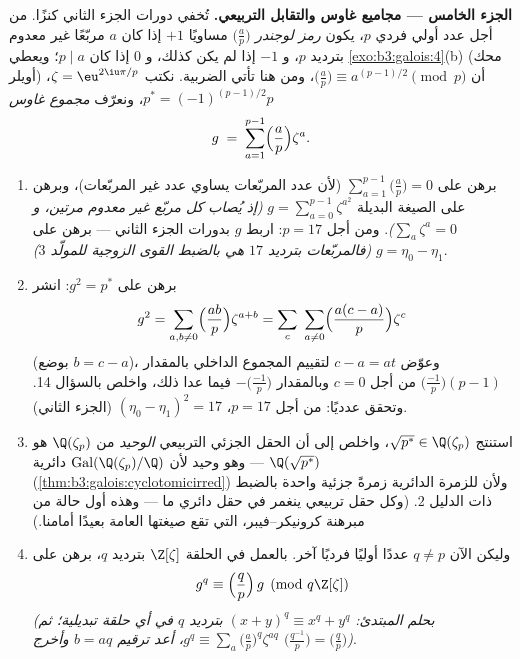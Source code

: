 \begin{problem}
\medskip
\noindent\textbf{الجزء الخامس --- مجاميع غاوس والتقابل
التربيعي.} تُخفي دورات الجزء الثاني كنزًا. من أجل عدد أولي فردي
$p$، يكون \emph{رمز لوجندر} $\bigl(\frac
ap\bigr)$ مساويًا $+1$ إذا كان $a$
مربّعًا غير معدوم بترديد $p$، و $-1$ إذا لم يكن كذلك، و $0$ إذا
كان $p \mid a$؛ ويعطي \cref{exo:b3:galois:4}(b) (محك أويلر) أن $\bigl(\frac ap\bigr) \equiv
a^{(p-1)/2} \pmod p$،
ومن هنا تأتي الضربية. نكتب $\zeta =
\eu^{2\iu\pi/p}$، $p^* = (-1)^{(p-1)/2}p$، ونعرّف \emph{مجموع
غاوس}
\[
g \;=\; \sum_{a=1}^{p-1}\Bigl(\frac ap\Bigr)\zeta^a .
\]
\begin{enumerate}[resume]
  \item برهن على $\sum_{a=1}^{p-1}\bigl(\frac ap\bigr) = 0$ (لأن عدد المربّعات يساوي عدد غير
        المربّعات)، وبرهن على الصيغة البديلة $g = \sum_{a=0}^{p-1}\zeta^{a^2}$ \emph{(إذ
        يُصاب كل مربّع غير معدوم مرتين، و $\sum_{a}\zeta^a = 0$)}. ومن أجل
        $p = 17$: اربط $g$ بدورات الجزء الثاني --- برهن على
        $g = \eta_0 - \eta_1$ \emph{(فالمربّعات بترديد $17$ هي بالضبط القوى
        الزوجية للمولّد $3$)}.
  \item برهن على $g^2 = p^*$: انشر
        \[
        g^2 = \sum_{a,b\neq0}\Bigl(\frac{ab}p\Bigr)
        \zeta^{a+b}
        = \sum_{c}\ \sum_{a \neq 0}\Bigl(\frac{a(c -
        a)}p\Bigr)\zeta^{c}
        \]
        (بوضع $b = c - a$)، وعوّض $c - a = at$ لتقييم المجموع
        الداخلي بالمقدار $\bigl(\frac{-1}p\bigr)(p - 1)$ من أجل $c = 0$ وبالمقدار
        $-\bigl(\frac{-1}p\bigr)$ فيما عدا ذلك، واخلص بالسؤال 14. وتحقق عدديًا:
        من أجل $p =
        17$، $(\eta_0 - \eta_1)^2 = 17$ (الجزء الثاني).
  \item استنتج $\sqrt{p^*} \in \Q(\zeta_p)$، واخلص إلى أن الحقل الجزئي التربيعي
        \emph{الوحيد} من $\Q(\zeta_p)$ هو $\Q(\sqrt{p^*})$ ---
        وهو وحيد لأن $\operatorname{Gal}(\Q(\zeta_p)/\Q)$ دائرية (\cref{thm:b3:galois:cyclotomicirred}) ولأن للزمرة
        الدائرية زمرةً جزئية واحدة بالضبط ذات الدليل $2$. (وكل
        حقل تربيعي ينغمر في حقل دائري ما --- وهذه أول حالة من
        مبرهنة كرونيكر--فيبر، التي تقع صيغتها العامة بعيدًا
        أمامنا.)
  \item وليكن الآن $q \neq p$ عددًا أوليًا فرديًا آخر. بالعمل في
        الحلقة $\Z[\zeta]$ بترديد $q$، برهن على
        \[
        g^q \equiv \Bigl(\frac qp\Bigr)\,g \pmod{q\Z[\zeta]}
        \]
        \emph{(بحلم المبتدئ: $(x + y)^q \equiv x^q + y^q$ بترديد $q$ في أي حلقة
        تبديلية؛ ثم $g^q \equiv
        \sum_a\bigl(\frac ap\bigr)^q\zeta^{aq}$، أعد ترقيم $b =
        aq$ وأخرج $\bigl(\frac{q^{-1}}p\bigr) =
        \bigl(\frac qp\bigr)$)}.

\end{enumerate}
\end{problem}
